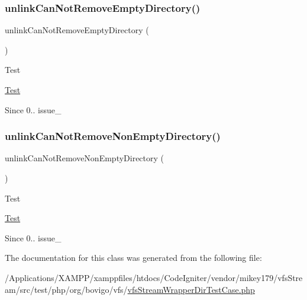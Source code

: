 \subsubsection{\texorpdfstring{unlink\+Can\+Not\+Remove\+Empty\+Directory()}{unlinkCanNotRemoveEmptyDirectory()}}
{\footnotesize\ttfamily unlink\+Can\+Not\+Remove\+Empty\+Directory (\begin{DoxyParamCaption}{ }\end{DoxyParamCaption})}

\begin{DoxyRefDesc}{Test}
\item[\mbox{\hyperlink{test__test000168}{Test}}]\end{DoxyRefDesc}
\begin{DoxySince}{Since}
0..  issue\+\_ 
\end{DoxySince}
\mbox{\label{classorg_1_1bovigo_1_1vfs_1_1vfs_stream_wrapper_mk_dir_test_case_ab8eedc60050e4ba45bf2b2a97304780a}} 
\subsubsection{\texorpdfstring{unlink\+Can\+Not\+Remove\+Non\+Empty\+Directory()}{unlinkCanNotRemoveNonEmptyDirectory()}}
{\footnotesize\ttfamily unlink\+Can\+Not\+Remove\+Non\+Empty\+Directory (\begin{DoxyParamCaption}{ }\end{DoxyParamCaption})}

\begin{DoxyRefDesc}{Test}
\item[\mbox{\hyperlink{test__test000167}{Test}}]\end{DoxyRefDesc}
\begin{DoxySince}{Since}
0..  issue\+\_ 
\end{DoxySince}


The documentation for this class was generated from the following file\+:\begin{DoxyCompactItemize}
\item 
/\+Applications/\+X\+A\+M\+P\+P/xamppfiles/htdocs/\+Code\+Igniter/vendor/mikey179/vfs\+Stream/src/test/php/org/bovigo/vfs/\mbox{\hyperlink{vfs_stream_wrapper_dir_test_case_8php}{vfs\+Stream\+Wrapper\+Dir\+Test\+Case.\+php}}\end{DoxyCompactItemize}
